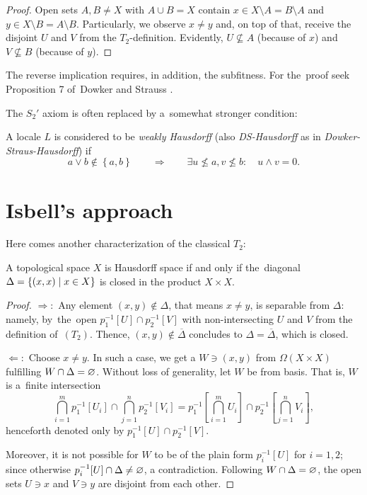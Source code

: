 \begin{proof}
  Open sets $A, B \ne X$ with $A \cup B = X$ contain $x\in X\setminus A =
  B\setminus A$ and $y\in X\setminus B = A\setminus B$.
  Particularly, we observe $x \ne y$ and, on top of that, receive the disjoint
  $U$ and $V$ from the $T_2$-definition.
  Evidently, $U\not\subseteq A$ (because of $x$) and $V\not\subseteq B$
  (because of $y$).
\end{proof}

\begin{rem}
  The reverse implication requires, in addition, the subfitness.
  For the~proof seek Proposition 7 of~Dowker and Strauss
  \cite{ds72}.
\end{rem}

The $S_2'$ axiom is often replaced by a~somewhat stronger condition:

\begin{framed}
  \begin{df}[DS-Haus]
    A locale $L$ is considered to be \emph{weakly Hausdorff\/} (also
    \emph{DS-Hausdorff} as in \emph{Dowker-Straus-Hausdorff}) if
    \[
      a \vee b \not\in \left\{a, b\right\} \qquad \Rightarrow \qquad \exists
      u\not\leq a, v\not\leq b: \quad u \wedge v = 0.
    \]
  \end{df}
\end{framed}

\section{Isbell's approach}

Here comes another characterization of the classical $T_2$:

\begin{prop}
  A topological space $X$ is Hausdorff space if and only if the~diagonal
  $\Delta = \left\{(x, x) \mid x\in X \right\}$ is closed in the product
  $X\times X$.
\end{prop}

\begin{proof}
  $\Rightarrow:$ Any element $(x, y)\not\in \Delta$, that means $x \ne y$, is
  separable from $\Delta$:
  namely, by~the~open $p_1^{-1}[U] \cap p_2^{-1}[V]$ with non-intersecting $U$
  and $V$ from the definition of~$(T_2)$.
  Thence, $(x, y)\not\in \overline{\Delta}$ concludes to $\Delta =
  \overline{\Delta}$, which is closed.

  $\Leftarrow:$ Choose $x \ne y$.
  In such a case, we get a $W\owns (x, y)$ from $\Omega(X\times X)$ fulfilling
  $W \cap \Delta = \varnothing$.
  Without loss of generality, let $W$ be from basis.
  That is, $W$ is a~finite intersection
  \[
    \bigcap_{i=1}^m p_1^{-1}[U_i] \cap \bigcap_{j=1}^n p_2^{-1}[V_i] =
    p_1^{-1}[\bigcap_{i=1}^m U_i] \cap p_2^{-1}[\bigcap_{j=1}^n V_i],
  \]
  henceforth denoted only by $p_1^{-1}[U] \cap p_2^{-1}[V]$.

  Moreover, it is not possible for $W$ to be of the plain form $p_i^{-1}[U]$
  for $i = 1, 2$;
  since otherwise $p_i^{-1}[U] \cap \Delta \ne \varnothing$, a contradiction.
  Following $W \cap \Delta = \varnothing$, the open sets $U\owns x$ and $V\owns y$
  are disjoint from each other.
\end{proof}

